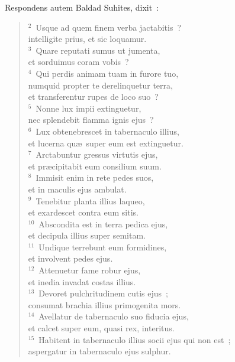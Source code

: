 \lettrine[lines=3,image=true,loversize=0.05,lraise=-0.03]{R}{}espondens autem Baldad Suhites, dixit~:
\begin{flushleft}\begin{verse}\vspace{6pt}${}^{2}$~Usque ad quem finem verba jactabitis~?\\ intelligite prius, et sic loquamur.\\
${}^{3}$~Quare reputati sumus ut jumenta,\\ et sorduimus coram vobis~?\\
${}^{4}$~Qui perdis animam tuam in furore tuo,\\ numquid propter te derelinquetur terra,\\ et transferentur rupes de loco suo~?\\
${}^{5}$~Nonne lux impii extinguetur,\\ nec splendebit flamma ignis ejus~?\\
${}^{6}$~Lux obtenebrescet in tabernaculo illius,\\ et lucerna qu\ae\ super eum est extinguetur.\\
${}^{7}$~Arctabuntur gressus virtutis ejus,\\ et pr\ae cipitabit eum consilium suum.\\
${}^{8}$~Immisit enim in rete pedes suos,\\ et in maculis ejus ambulat.\\
${}^{9}$~Tenebitur planta illius laqueo,\\ et exardescet contra eum sitis.\\
${}^{10}$~Abscondita est in terra pedica ejus,\\ et decipula illius super semitam.\\
${}^{11}$~Undique terrebunt eum formidines,\\ et involvent pedes ejus.\\
${}^{12}$~Attenuetur fame robur ejus,\\ et inedia invadat costas illius.\\
${}^{13}$~Devoret pulchritudinem cutis ejus~;\\ consumat brachia illius primogenita mors.\\
${}^{14}$~Avellatur de tabernaculo suo fiducia ejus,\\ et calcet super eum, quasi rex, interitus.\\
${}^{15}$~Habitent in tabernaculo illius socii ejus qui non est~;\\ aspergatur in tabernaculo ejus sulphur.\\

\end{verse}
\end{flushleft}
